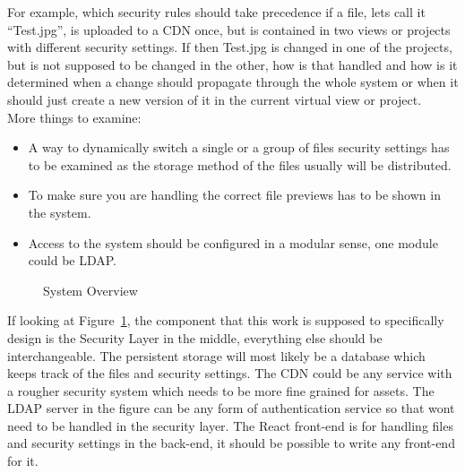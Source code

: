 \documentclass[a4paper,12pt]{article}
\begin{document}
For example, which security rules should take precedence if a file, lets call it 
``Test.jpg'', is uploaded to a CDN once, but is contained in two views or projects 
with different security settings. If then Test.jpg is changed in one of the projects, 
but is not supposed to be changed in the other, how is that handled and how is 
it determined when a change should propagate through the whole system or when it 
should just create a new version of it in the current virtual view or project.
\vspace{12pt}
\\
More things to examine:
\begin{itemize}
    \item A way to dynamically switch a single or a group of files security settings has 
to be examined as the storage method of the files usually will be distributed.
    \item To make sure you are handling the correct file previews has to be shown in the system.
    \item Access to the system should be configured in a modular sense, one module could be 
LDAP.
\end{itemize}

\begin{figure}[htp] 
    \caption{System Overview}
    \label{fig:overview}
\end{figure}
If looking at Figure~\ref{fig:overview}, the component that this work is supposed to specifically 
design is the Security Layer in the middle, everything else should be interchangeable. The persistent 
storage will most likely be a database which keeps track of the files and security settings. 
The CDN could be any service with a rougher security system which needs to be more 
fine grained for assets. The LDAP server in the figure can be any form of authentication service so that 
wont need to be handled in the security layer. The React front-end is for handling files and 
security settings in the back-end, it should be possible to write any front-end for it.
\end{document}
